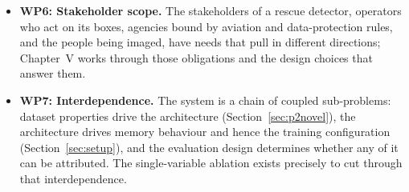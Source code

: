 \begin{itemize}
        prescribes how to evaluate or deploy a tiny-human detector for
        search and rescue. The evaluation protocol, the frozen-split and
        provenance rules, and the operational threshold policy
        (Sections~\ref{sec:metrics} and~\ref{sec:protocol}) had to be designed for the problem.
  \item \textbf{WP6: Stakeholder scope.} The stakeholders of a rescue
        detector, operators who act on its boxes, agencies bound by aviation
        and data-protection rules, and the people being imaged, have needs
        that pull in different directions; Chapter~V works through those
        obligations and the design choices that answer them.
  \item \textbf{WP7: Interdependence.} The system is a chain of coupled
        sub-problems: dataset properties drive the architecture
        (Section~\ref{sec:p2novel}), the architecture drives memory behaviour and hence
        the training configuration (Section~\ref{sec:setup}), and the evaluation design
        determines whether any of it can be attributed. The single-variable
        ablation exists precisely to cut through that interdependence.
\end{itemize}

